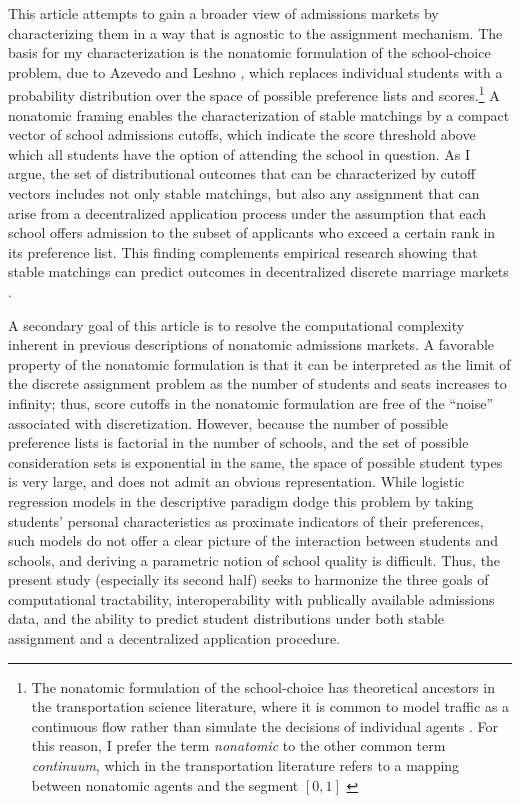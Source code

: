\documentclass[12pt]{article}
\numberwithin{equation}{subsection}
\theoremstyle{definition}
\begin{document}
This article attempts to gain a broader view of admissions markets by characterizing them in a way that is agnostic to the assignment mechanism. The basis for my characterization is the nonatomic formulation of the school-choice problem, due to Azevedo and Leshno \parencite*{supplydemandfw}, which replaces individual students with a probability distribution over the space of possible preference lists and scores.\footnote{The nonatomic formulation of the school-choice has theoretical ancestors in the transportation science literature, where it is common to model traffic as a continuous flow rather than simulate the decisions of individual agents \parencite[][]{sometheoreticalaspectsofroadtraffic, theeconomicsofwelfare}. For this reason, I prefer the term \emph{nonatomic} to the other common term \emph{continuum}, which in the transportation literature refers to a mapping between nonatomic agents and the segment $[0,1]$ \parencite[as in][for example]{고석준thesis}} A nonatomic framing enables the characterization of stable matchings by a compact vector of school admissions cutoffs, which indicate the score threshold above which all students have the option of attending the school in question. As I argue, the set of distributional outcomes that can be characterized by cutoff vectors includes not only stable matchings, but also any assignment that can arise from a decentralized application process under the assumption that each school offers admission to the subset of applicants who exceed a certain rank in its preference list. This finding complements empirical research showing that stable matchings can predict outcomes in decentralized discrete marriage markets \parencite[][]{marryforwhat, matchingandsortinginonlinedating}.

A secondary goal of this article is to resolve the computational complexity inherent in previous descriptions of nonatomic admissions markets. A favorable property of the nonatomic formulation is that it can be interpreted as the limit of the discrete assignment problem as the number of students and seats increases to infinity; thus, score cutoffs in the nonatomic formulation are free of the ``noise'' associated with discretization. However, because the number of possible preference lists is factorial in the number of schools, and the set of possible consideration sets is exponential in the same, the space of possible student types is very large, and does not admit an obvious representation. While logistic regression models in the descriptive paradigm dodge this problem by taking students' personal characteristics as proximate indicators of their preferences, such models do not offer a clear picture of the interaction between students and schools, and deriving a parametric notion of school quality is difficult. Thus, the present study (especially its second half) seeks to harmonize the three goals of computational tractability, interoperability with publically available admissions data, and the ability to predict student distributions under both stable assignment and a decentralized application procedure.
\end{document}
